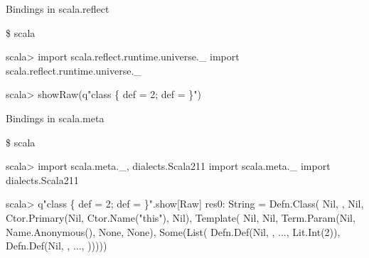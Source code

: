 \documentclass[svgnames,dvipsnames,hyperref={bookmarks=false},usepdftitle=false]{beamer}
\begin{document}
\begin{frame}[fragile]{Bindings in scala.reflect}
\begin{semiverbatim}
\small
\$ scala

scala> import scala.reflect.runtime.universe.\_
import scala.reflect.runtime.universe.\_

scala> showRaw(q"class  \{ def  = 2; def  =  \}")
\end{semiverbatim}
\end{frame}

\begin{frame}[fragile]{Bindings in scala.meta}
\begin{semiverbatim}
\small
\$ scala

scala> import scala.meta.\_, dialects.Scala211
import scala.meta.\_
import dialects.Scala211

scala> q"class \text{\color{blue}{C}} \{ def \text{\color{red}{x}} = 2; def \text{\color{LimeGreen}{y}} = \text{\color{red}{x}} \}".show[Raw]
res0: String = Defn.Class(
  Nil, \text{\color{blue}{Type.Name("C")}}, Nil,
  Ctor.Primary(Nil, Ctor.Name("this"), Nil),
  Template(
    Nil, Nil,
    Term.Param(Nil, Name.Anonymous(), None, None),
    Some(List(
      Defn.Def(Nil, \text{\color{red}{Term.Name("x")}}, ..., Lit.Int(2)),
      Defn.Def(Nil, \text{\color{LimeGreen}{Term.Name("y")}}, ..., \text{\color{red}{Term.Name("x")}})))))
\end{semiverbatim}
\end{frame}
\end{document}
